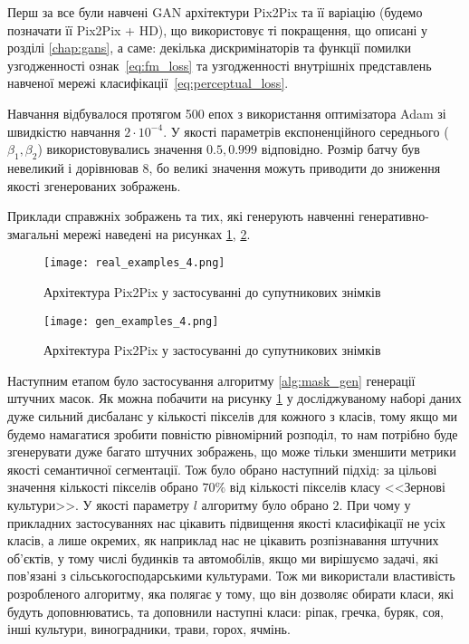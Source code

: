 Перш за все були навчені GAN архітектури Pix2Pix та її варіацію
(будемо позначати її Pix2Pix + HD),
що використовує ті покращення, що
описані у розділі \ref{chap:gans}, а саме:
декілька дискримінаторів та функції помилки узгодженності
ознак~\eqref{eq:fm_loss} та узгодженності внутрішніх представлень
навченої мережі класифікації~\eqref{eq:perceptual_loss}.

Навчання відбувалося протягом 500 епох з використання
оптимізатора Adam \cite{kingma2014adam} зі швидкістю навчання
$2 \cdot 10^{-4}$. У якості параметрів експоненційного
середнього ($\beta_1, \beta_2$) використовувались
значення $0.5, 0.999$ відповідно. Розмір батчу був невеликий і
дорівнював $8$, бо великі значення можуть приводити до
зниження якості згенерованих зображень.

Приклади справжніх зображень та тих, які генерують навченні
генеративно-змагальні мережі наведені на рисунках
\ref{fig:real_examples}, \ref{fig:gen_pix2pix_examples}.

\begin{figure}[ht]
    \centering
    \texttt{[image: real\_examples\_4.png]}
    \caption{Архітектура Pix2Pix у застосуванні до супутникових знімків}
    \label{fig:real_examples}
\end{figure}

\begin{figure}[ht]
    \centering
    \texttt{[image: gen\_examples\_4.png]}
    \caption{Архітектура Pix2Pix у застосуванні до супутникових знімків}
    \label{fig:gen_pix2pix_examples}
\end{figure}

Наступним етапом було застосування алгоритму \ref{alg:mask_gen} генерації
штучних масок. Як можна побачити на рисунку \ref{fig:real_examples}
у досліджуваному наборі даних дуже сильний дисбаланс у кількості
пікселів для кожного з класів, тому якщо ми будемо намагатися
зробити повністю рівномірний розподіл, то нам потрібно буде
згенерувати дуже багато штучних зображень, що
може тільки зменшити метрики якості семантичної сегментації.
Тож було обрано наступний підхід: за цільові значення кількості пікселів
обрано $70\%$ від кількості пікселів класу <<Зернові культури>>.
У якості параметру $l$ алгоритму було обрано $2$. При чому
у прикладних застосуваннях нас цікавить підвищення якості класифікації не усіх
класів, а лише окремих, як наприклад нас не цікавить розпізнавання
штучних об'єктів, у тому числі будинків та автомобілів,
якщо ми вирішуємо задачі, які пов'язані з сільськогосподарськими
культурами. Тож ми використали властивість розробленого алгоритму,
яка полягає у тому, що він дозволяє обирати
класи, які будуть доповнюватись, та доповнили наступні класи:
ріпак, гречка, буряк, соя, інші культури, виноградники, трави,
горох, ячмінь.

